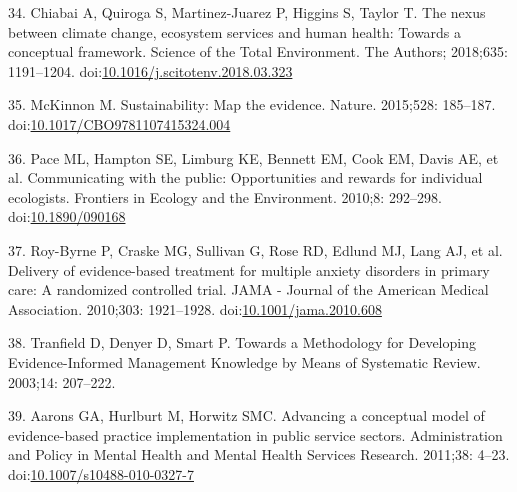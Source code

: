 \documentclass[10pt,letterpaper]{article}
\begin{document}
\hypertarget{ref-Chiabai2018}{}
34. Chiabai A, Quiroga S, Martinez-Juarez P, Higgins S, Taylor T. The
nexus between climate change, ecosystem services and human health:
Towards a conceptual framework. Science of the Total Environment. The
Authors; 2018;635: 1191--1204.
doi:\href{https://doi.org/10.1016/j.scitotenv.2018.03.323}{10.1016/j.scitotenv.2018.03.323}

\hypertarget{ref-McKinnon2015}{}
35. McKinnon M. Sustainability: Map the evidence. Nature. 2015;528:
185--187.
doi:\href{https://doi.org/10.1017/CBO9781107415324.004}{10.1017/CBO9781107415324.004}

\hypertarget{ref-Pace2010}{}
36. Pace ML, Hampton SE, Limburg KE, Bennett EM, Cook EM, Davis AE, et
al. Communicating with the public: Opportunities and rewards for
individual ecologists. Frontiers in Ecology and the Environment. 2010;8:
292--298. doi:\href{https://doi.org/10.1890/090168}{10.1890/090168}

\hypertarget{ref-Roy-Byrne2010}{}
37. Roy-Byrne P, Craske MG, Sullivan G, Rose RD, Edlund MJ, Lang AJ, et
al. Delivery of evidence-based treatment for multiple anxiety disorders
in primary care: A randomized controlled trial. JAMA - Journal of the
American Medical Association. 2010;303: 1921--1928.
doi:\href{https://doi.org/10.1001/jama.2010.608}{10.1001/jama.2010.608}

\hypertarget{ref-Tranfield2003}{}
38. Tranfield D, Denyer D, Smart P. Towards a Methodology for Developing
Evidence-Informed Management Knowledge by Means of Systematic Review.
2003;14: 207--222.

\hypertarget{ref-Aarons2011}{}
39. Aarons GA, Hurlburt M, Horwitz SMC. Advancing a conceptual model of
evidence-based practice implementation in public service sectors.
Administration and Policy in Mental Health and Mental Health Services
Research. 2011;38: 4--23.
doi:\href{https://doi.org/10.1007/s10488-010-0327-7}{10.1007/s10488-010-0327-7}

\nolinenumbers
\end{document}
